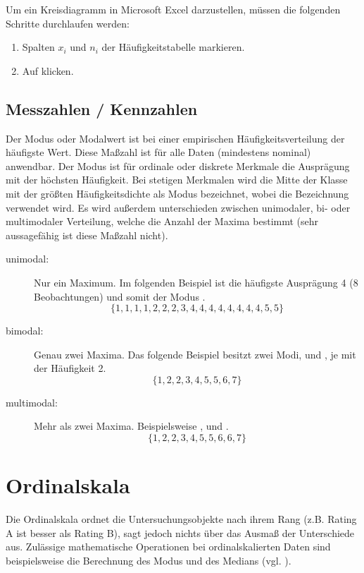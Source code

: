 Um ein Kreisdiagramm in Microsoft Excel darzustellen, müssen die folgenden Schritte durchlaufen
werden:

\begin{enumerate}
  \item Spalten $x_i$ und $n_i$ der Häufigkeitstabelle markieren.
  \item Auf  klicken.
\end{enumerate}



\subsection{Messzahlen / Kennzahlen}

Der Modus oder Modalwert ist bei einer empirischen Häufigkeitsverteilung der häufigste Wert. Diese
Maßzahl ist für alle Daten (mindestens nominal) anwendbar. Der Modus ist für ordinale oder diskrete
Merkmale die Ausprägung mit der höchsten Häufigkeit. Bei stetigen Merkmalen wird die Mitte der
Klasse mit der größten Häufigkeitsdichte als Modus bezeichnet, wobei die Bezeichnung  verwendet wird. Es wird außerdem unterschieden zwischen unimodaler, bi- oder multimodaler
Verteilung, welche die Anzahl der Maxima bestimmt (sehr aussagefähig ist diese Maßzahl nicht).
\begin{description}
  \item[unimodal:] Nur ein Maximum. Im folgenden Beispiel ist die häufigste Ausprägung 4 (8
  Beobachtungen) und somit der Modus . \[\{1,1,1,1,2,2,2,3,4,4,4,4,4,4,4,4,5,5\}\]
  \item[bimodal:] Genau zwei Maxima. Das folgende Beispiel besitzt zwei Modi, 
  und , je mit der Häufigkeit 2. \[\{1,2,2,3,4,5,5,6,7\}\]
  \item[multimodal:] Mehr als zwei Maxima. Beispielsweise ,  und
  . \[\{1,2,2,3,4,5,5,6,6,7\}\]
\end{description} 
 


\section{Ordinalskala}
Die Ordinalskala ordnet die Untersuchungsobjekte nach ihrem Rang (z.B. Rating A ist besser als
Rating B), sagt jedoch nichts über das Ausmaß der Unterschiede aus. Zulässige mathematische
Operationen bei ordinalskalierten Daten sind beispielsweise die Berechnung des Modus und des
Medians (vgl. ).

